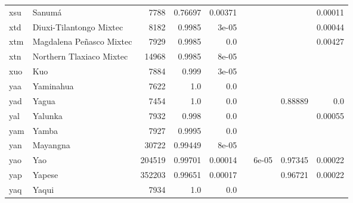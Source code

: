 \documentclass[11pt]{article}
\begin{document}
\begin{table*}[h]
{\begin{tabular}{llrrrrrrr}
xsu         & Sanumá         & 7788         & 0.76697         & 0.00371         &          &          &          & 0.00011         \\

xtd         & Diuxi-Tilantongo Mixtec         & 8182         & 0.9985         & 3e-05         &          &          &          & 0.00044         \\

xtm         & Magdalena Peñasco Mixtec         & 7929         & 0.9985         & 0.0         &          &          &          & 0.00427         \\

xtn         & Northern Tlaxiaco Mixtec         & 14968         & 0.9985         & 8e-05         &          &          &          &          \\

xuo         & Kuo         & 7884         & 0.999         & 3e-05         &          &          &          &          \\

yaa         & Yaminahua         & 7622         & 1.0         & 0.0         &          &          &          &          \\

yad         & Yagua         & 7454         & 1.0         & 0.0         &          &          & 0.88889         & 0.0         \\

yal         & Yalunka         & 7932         & 0.998         & 0.0         &          &          &          & 0.00055         \\

yam         & Yamba         & 7927         & 0.9995         & 0.0         &          &          &          &          \\

yan         & Mayangna         & 30722         & 0.99449         & 8e-05         &          &          &          &          \\

yao         & Yao         & 204519         & 0.99701         & 0.00014         &          & 6e-05         & 0.97345         & 0.00022         \\

yap         & Yapese         & 352203         & 0.99651         & 0.00017         &          &          & 0.96721         & 0.00022         \\

yaq         & Yaqui         & 7934         & 1.0         & 0.0         &          &          &          &          \\


\end{tabular}}
\end{table*}
\end{document}
